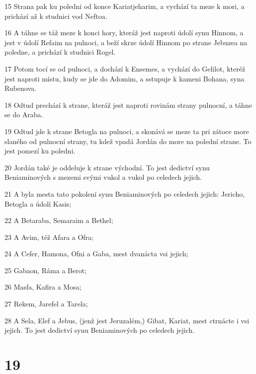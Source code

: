 \par 15 Strana pak ku poledni od konce Kariatjeharim, a vychází ta meze k mori, a prichází až k studnici vod Neftoa.
\par 16 A táhne se táž meze k konci hory, kteráž jest naproti údolí synu Hinnom, a jest v údolí Refaim na pulnoci, a beží skrze údolí Hinnom po strane Jebuzea na poledne, a prichází k studnici Rogel.
\par 17 Potom tocí se od pulnoci, a dochází k Ensemes, a vychází do Gelilot, kteréž jest naproti místu, kudy se jde do Adomim, a sstupuje k kameni Bohana, syna Rubenova.
\par 18 Odtud prechází k strane, kteráž jest naproti rovinám strany pulnocní, a táhne se do Araba.
\par 19 Odtud jde k strane Betogla na pulnoci, a skonává se meze ta pri zátoce more slaného od pulnocní strany, tu kdež vpadá Jordán do more na polední strane. To jest pomezí ku poledni.
\par 20 Jordán také je oddeluje k strane východní. To jest dedictví synu Beniaminových s mezemi svými vukol a vukol po celedech jejich.
\par 21 A byla mesta tato pokolení synu Beniaminových po celedech jejich: Jericho, Betogla a údolí Kasis;
\par 22 A Betaraba, Semaraim a Bethel;
\par 23 A Avim, též Afara a Ofra;
\par 24 A Cefer, Hamona, Ofni a Gaba, mest dvanácta vsi jejich;
\par 25 Gabaon, Ráma a Berot;
\par 26 Masfa, Kafira a Mosa;
\par 27 Rekem, Jarefel a Tarela;
\par 28 A Sela, Elef a Jebus, (jenž jest Jeruzalém,) Gibat, Kariat, mest ctrnácte i vsi jejich. To jest dedictví synu Beniaminových po celedech jejich.

\chapter{19}

